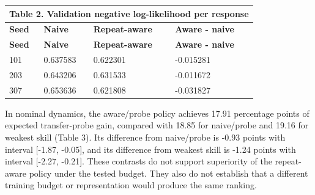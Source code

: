 \documentclass[preprint,11pt,authoryear]{elsarticle}
\begin{document}
\begin{longtable}{p{}p{}p{}p{}}

\multicolumn{4}{l}{\textbf{Table 2.} Validation negative log-likelihood per response}\\

\toprule

\textbf{Seed} & \textbf{Naive} & \textbf{Repeat-aware} & \textbf{Aware - naive}\\\midrule\endfirsthead

\textbf{Seed} & \textbf{Naive} & \textbf{Repeat-aware} & \textbf{Aware - naive}\\\midrule\endhead

\bottomrule\endfoot

101 & 0.637583 & 0.622301 & -0.015281\\

203 & 0.643206 & 0.631533 & -0.011672\\

307 & 0.653636 & 0.621808 & -0.031827\\

\end{longtable}\endgroup

In nominal dynamics, the aware/probe policy achieves 17.91 percentage points of expected transfer-probe gain, compared with 18.85 for naive/probe and 19.16 for weakest skill (Table 3). Its difference from naive/probe is -0.93 points with interval [-1.87, -0.05], and its difference from weakest skill is -1.24 points with interval [-2.27, -0.21]. These contrasts do not support superiority of the repeat-aware policy under the tested budget. They also do not establish that a different training budget or representation would produce the same ranking.

\begingroup\small\setlength{\tabcolsep}{3pt}
\end{document}
